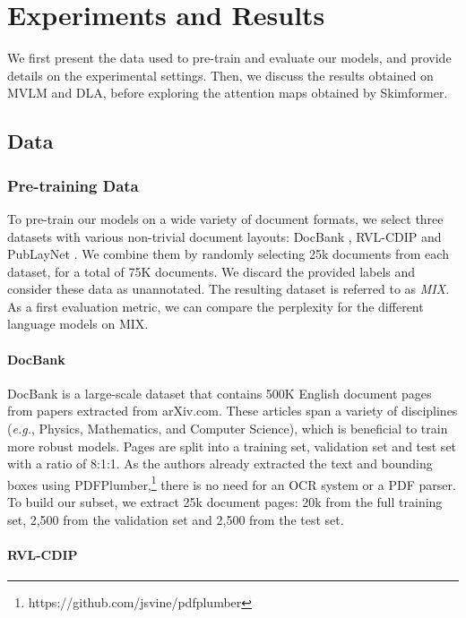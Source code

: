\section{Experiments and Results}

We first present the data used to pre-train and evaluate our models, and provide details on the experimental settings. Then, we discuss the results obtained on \ac{MVLM} and \ac{DLA}, before exploring the attention maps obtained by Skimformer.

\subsection{Data}

\subsubsection{Pre-training Data}

To pre-train our models on a wide variety of document formats, we select three datasets with various non-trivial document layouts: DocBank \citep{li2020docbank}, RVL-CDIP \citep{harley2015evaluation} and PubLayNet \citep{zhong2019publaynet}. We combine them by randomly selecting 25k documents from each dataset, for a total of 75K documents. We discard the provided labels and consider these data as unannotated. The resulting dataset is referred to as \textit{MIX}. As a first evaluation metric, we can compare the perplexity for the different language models on MIX. 

\paragraph{DocBank}

DocBank is a large-scale dataset that contains 500K English document pages from papers extracted from arXiv.com. These articles span a variety of disciplines (\textit{e.g.}, Physics, Mathematics, and Computer Science), which is beneficial to train more robust models. Pages are split into a training set, validation set and test set with a ratio of 8:1:1. As the authors already extracted the text and bounding boxes using PDFPlumber,\footnote{https://github.com/jsvine/pdfplumber} there is no need for an OCR system or a PDF parser. To build our subset, we extract 25k document pages: 20k from the full training set, 2,500 from the validation set and 2,500 from the test set. 

\paragraph{RVL-CDIP}

